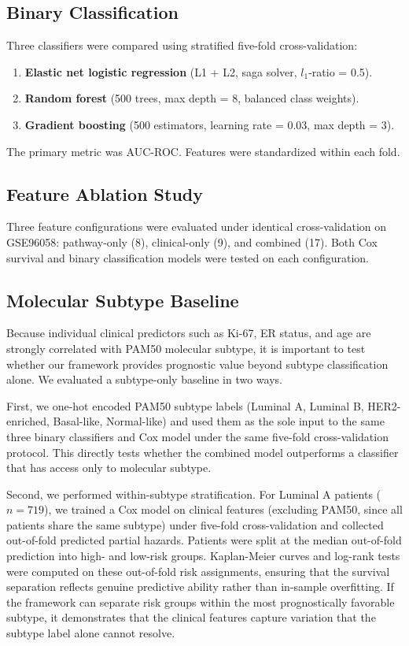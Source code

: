 \documentclass[journal]{IEEEtran}
\begin{document}
\subsection{Binary Classification}

Three classifiers were compared using stratified five-fold cross-validation:
\begin{enumerate}
    \item \textbf{Elastic net logistic regression} (L1 + L2, saga solver, $l_1$-ratio = 0.5).
    \item \textbf{Random forest} (500 trees, max depth = 8, balanced class weights).
    \item \textbf{Gradient boosting} (500 estimators, learning rate = 0.03, max depth = 3).
\end{enumerate}
The primary metric was AUC-ROC. Features were standardized within each fold.

\subsection{Feature Ablation Study}

Three feature configurations were evaluated under identical cross-validation on GSE96058: pathway-only (8), clinical-only (9), and combined (17). Both Cox survival and binary classification models were tested on each configuration.

\subsection{Molecular Subtype Baseline}
\label{sec:subtype_baseline}

Because individual clinical predictors such as Ki-67, ER status, and age are strongly correlated with PAM50 molecular subtype, it is important to test whether our framework provides prognostic value beyond subtype classification alone. We evaluated a subtype-only baseline in two ways.

First, we one-hot encoded PAM50 subtype labels (Luminal A, Luminal B, HER2-enriched, Basal-like, Normal-like) and used them as the sole input to the same three binary classifiers and Cox model under the same five-fold cross-validation protocol. This directly tests whether the combined model outperforms a classifier that has access only to molecular subtype.

Second, we performed within-subtype stratification. For Luminal A patients ($n = 719$), we trained a Cox model on clinical features (excluding PAM50, since all patients share the same subtype) under five-fold cross-validation and collected out-of-fold predicted partial hazards. Patients were split at the median out-of-fold prediction into high- and low-risk groups. Kaplan-Meier curves and log-rank tests were computed on these out-of-fold risk assignments, ensuring that the survival separation reflects genuine predictive ability rather than in-sample overfitting. If the framework can separate risk groups within the most prognostically favorable subtype, it demonstrates that the clinical features capture variation that the subtype label alone cannot resolve.
\end{document}
